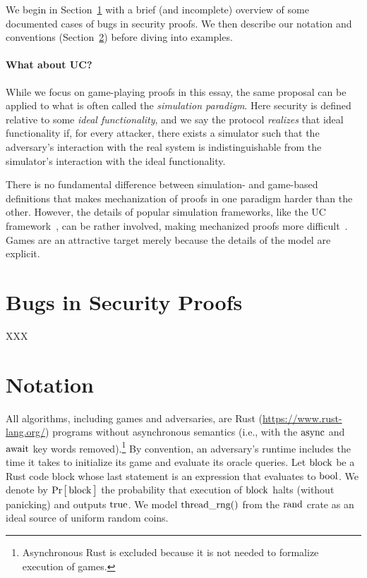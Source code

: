 \documentclass{article}
\newcommand{\Prob}[1]{\Pr\hspace{-1pt}\big[\,#1\,\big]}
\newcommand{\code}[1]{\textrm{\textup{\lstinline{#1}}}}
\begin{document}
We begin in Section~\ref{sec/bugs} with a brief (and incomplete) overview of
some documented cases of bugs in security proofs.
%
We then describe our notation and conventions (Section~\ref{sec/notation})
before diving into examples.

\paragraph{What about UC?}
%
While we focus on game-playing proofs in this essay, the same proposal can be
applied to what is often called the \emph{simulation paradigm}. Here security
is defined relative to some \emph{ideal functionality}, and we say the protocol
\emph{realizes} that ideal functionality if, for every attacker, there exists a
simulator such that the adversary's interaction with the real system is
indistinguishable from the simulator's interaction with the ideal
functionality.

There is no fundamental difference between simulation- and game-based
definitions that makes mechanization of proofs in one paradigm harder than the
other.
%
However, the details of popular simulation frameworks, like the UC
framework~\cite{Can01}, can be rather involved, making mechanized proofs more
difficult~\cite{CSV19}.
%
Games are an attractive target merely because the details of the model are
explicit.

\section{Bugs in Security Proofs}\label{sec/bugs}

XXX


\section{Notation}\label{sec/notation}

All algorithms, including games and adversaries, are Rust
(\url{https://www.rust-lang.org/}) programs without asynchronous semantics
(i.e., with the $\code{async}$ and $\code{await}$ key words
removed).\footnote{Asynchronous Rust is excluded because it is not needed to
formalize execution of games.}
%
By convention, an adversary's runtime includes the time it takes to initialize
its game and evaluate its oracle queries.
%
Let $\code{block}$ be a Rust code block whose last statement is an expression
that evaluates to $\code{bool}$.
%
We denote by $\Prob{\code{block}}$ the probability that execution of
$\code{block}$ halts (without panicking) and outputs $\code{true}$.
%
We model
\href{https://rust-random.github.io/rand/rand/fn.thread_rng.html}{$\code{thread_rng()}$}
from the
\href{https://rust-random.github.io/rand/rand/index.html}{$\code{rand}$} crate
as an ideal source of uniform random coins.
\end{document}
